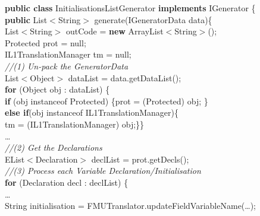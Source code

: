 \documentclass{llncs}%
\begin{document}
\begin{figure}[t]
\centering
\begin{minipage}{0.95\textwidth}
\begin{spacing}{0.8}
\small
\textbf{public class} InitialisationsListGenerator \textbf{implements} IGenerator \{\\
\hspace*{0.2cm}\textbf{public} List$<$String$>$ generate(IGeneratorData data)\{\\
\hspace*{0.4cm}List$<$String$>$ outCode = \textbf{new} ArrayList$<$String$>$();\\
\hspace*{0.4cm}Protected prot = null;\\
\hspace*{0.4cm}IL1TranslationManager tm = null;\\
\hspace*{0.4cm}\emph{//(1) Un-pack the GeneratorData}\\
\hspace*{0.4cm}List$<$Object$>$ dataList = data.getDataList();\\
\hspace*{0.4cm}\textbf{for} (Object obj : dataList) \{\\
\hspace*{0.6cm}\textbf{if} (obj instanceof Protected) \{prot = (Protected) obj;	\}\\
\hspace*{0.6cm}\textbf{else if}(obj instanceof IL1TranslationManager)\{\\
\hspace*{0.8cm}tm = (IL1TranslationManager) obj;\}\}\\
\hspace*{0.2cm}\ldots\\
\hspace*{0.2cm}\emph{//(2) Get the Declarations}\\
\hspace*{0.2cm}EList$<$Declaration$>$ declList = prot.getDecls();\\
\hspace*{0.2cm}\emph{//(3) Process each Variable Declaration/Initialisation}\\
\hspace*{0.2cm}\textbf{for} (Declaration decl : declList) \{\\
\hspace*{0.4cm}\ldots\\
\hspace*{0.4cm}String initialisation = FMUTranslator.updateFieldVariableName(\ldots);\\

\end{spacing}
\end{minipage}
\end{figure}
\end{document}
